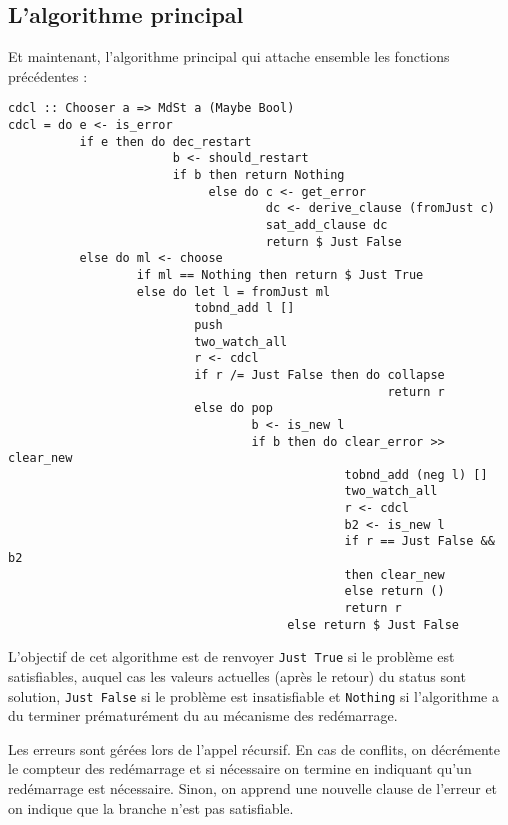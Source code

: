 \subsection{L'algorithme principal}
Et maintenant, l'algorithme principal qui attache ensemble les fonctions
précédentes :
\begin{lstlisting}
cdcl :: Chooser a => MdSt a (Maybe Bool)
cdcl = do e <- is_error
          if e then do dec_restart
                       b <- should_restart
                       if b then return Nothing
                            else do c <- get_error
                                    dc <- derive_clause (fromJust c)
                                    sat_add_clause dc
                                    return $ Just False
          else do ml <- choose
                  if ml == Nothing then return $ Just True
                  else do let l = fromJust ml
                          tobnd_add l []
                          push
                          two_watch_all
                          r <- cdcl
                          if r /= Just False then do collapse
                                                     return r
                          else do pop
                                  b <- is_new l
                                  if b then do clear_error >> clear_new
                                               tobnd_add (neg l) []
                                               two_watch_all
                                               r <- cdcl
                                               b2 <- is_new l
                                               if r == Just False && b2
                                               then clear_new
                                               else return ()
                                               return r
                                       else return $ Just False
\end{lstlisting}%

L'objectif de cet algorithme est de renvoyer \texttt{Just True} si le problème
est satisfiables, auquel cas les valeurs actuelles (après le retour) du status
sont solution, \texttt{Just False} si le problème est insatisfiable et
\texttt{Nothing} si l'algorithme a du terminer prématurément du au mécanisme
des redémarrage.

Les erreurs sont gérées lors de l'appel récursif. En cas de conflits, on
décrémente le compteur des redémarrage et si nécessaire on termine en indiquant
qu'un redémarrage est nécessaire. Sinon, on apprend une nouvelle clause de
l'erreur et on indique que la branche n'est pas satisfiable.


